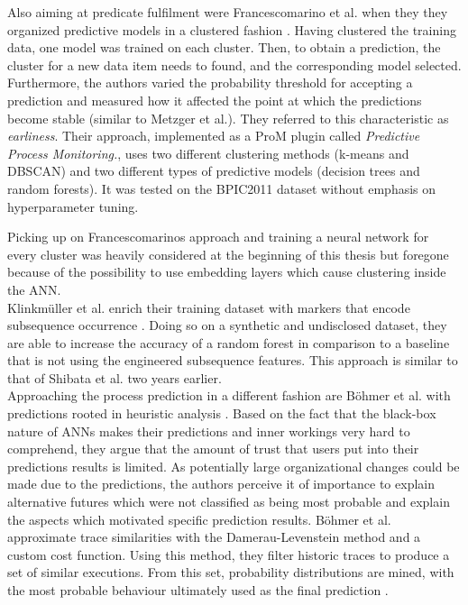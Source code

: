 Also aiming at predicate fulfilment were Francescomarino et al. when they they organized predictive models in a clustered fashion \cite{francescomarino2015}. Having clustered the training data, one model was trained on each cluster. Then, to obtain a prediction, the cluster for a new data item needs to found, and the corresponding model selected. Furthermore, the authors varied the probability threshold for accepting a prediction and measured how it affected the point at which the predictions become stable (similar to Metzger et al.). They referred to this characteristic as \textit{earliness}. Their approach, implemented as a ProM plugin called \textit{Predictive Process Monitoring.}, uses two different clustering methods (k-means and DBSCAN) and two different types of predictive models (decision trees and random forests). It was tested on the BPIC2011 dataset \cite{BPIC2011} without emphasis on hyperparameter tuning.

Picking up on Francescomarinos approach and training a neural network for every cluster was heavily considered at the beginning of this thesis but foregone because of the possibility to use embedding layers which cause clustering inside the ANN.\\

Klinkmüller et al. enrich their training dataset with markers that encode subsequence occurrence \cite{klinkmuller2018reliablemonitoring}. Doing so on a synthetic and undisclosed dataset, they are able to increase the accuracy of a random forest in comparison to a baseline that is not using the engineered subsequence features. This approach is similar to that of Shibata et al. \cite{shibata2016bipartite} two years earlier.\\

Approaching the process prediction in a different fashion are Böhmer et al. with predictions rooted in heuristic analysis \cite{boehmer2018probability}. Based on the fact that the black-box nature of ANNs makes their predictions and inner workings very hard to comprehend, they argue that the amount of trust that users put into their predictions results is limited. As potentially large organizational changes could be made due to the predictions, the authors perceive it of importance to explain alternative futures which were not classified as being most probable and explain the aspects which motivated specific prediction results.
Böhmer et al. approximate trace similarities with the Damerau-Levenstein method and a custom cost function. Using this method, they filter historic traces to produce a set of similar executions. From this set, probability distributions are mined, with the most probable behaviour ultimately used as the final prediction \cite{boehmer2018probability}.

